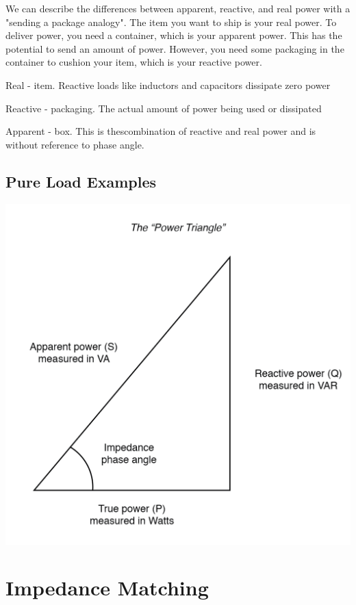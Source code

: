 We can describe the differences between apparent, reactive, and real power with a "sending a package analogy". The item you want to ship is your real power. To deliver power, you need a container, which is your apparent power. This has the potential to send an amount of power. However, you need some packaging in the container to cushion your item, which is your reactive power.
\begin{pline}
    \item Real - item. Reactive loads like inductors and capacitors dissipate zero power
    \item Reactive - packaging. The actual amount of power being used or dissipated
    \item Apparent - box. This is thescombination of reactive and real power and is without reference to phase angle.
\end{pline}

\subsection{Pure Load Examples}

\begin{center}
    \includegraphics[scale=0.2]{figs/ch01/power_triangle.png}
\end{center}

\section{Impedance Matching}


